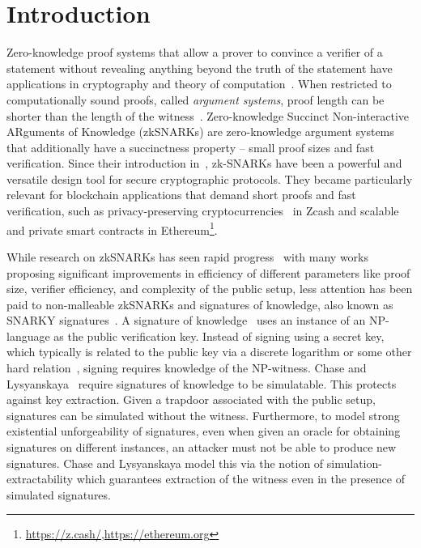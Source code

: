 \section{Introduction}
Zero-knowledge proof systems that allow a prover to convince a verifier of a statement without revealing anything beyond the truth of the statement have applications in cryptography and theory of computation~\cite{FOCS:GolMicWig86,STOC:Fortnow87,C:BGGHKMR88}. 
When restricted to computationally sound proofs, called \emph{argument systems}, proof length can be shorter than the length of the witness~\cite{brassard1988minimum}. 
Zero-knowledge Succinct Non-interactive ARguments of Knowledge (zkSNARKs) are zero-knowledge argument systems that additionally have a succinctness property -- small proof sizes and fast verification. 
Since their introduction in~\cite{FOCS:Micali94}, zk-SNARKs have been a powerful and versatile design tool for secure cryptographic protocols. They became particularly relevant for blockchain applications that demand short proofs and fast verification, such as privacy-preserving cryptocurrencies~\cite{SP:BCGGMT14} in Zcash and scalable and private smart contracts in Ethereum\footnote{\url{https://z.cash/},\url{https://ethereum.org}}.


While research on zkSNARKs has seen rapid progress~\cite{EC:GGPR13,IKO07,AC:Groth10a,TCC:Lipmaa12,TCC:BCIOP13,SP:PHGR13,C:BCGTV13,AC:Lipmaa13,USENIX:BCTV14,EC:Groth16} with many works proposing significant improvements in efficiency of different parameters like proof size, verifier efficiency, and complexity of the public setup, less attention has been paid to non-malleable zkSNARKs and signatures of knowledge, also known as SNARKY signatures~\cite{C:GroMal17,EPRINT:BKSV20}. A signature of knowledge~\cite{C:CamSta97,C:ChaLys06} uses an instance of an NP-language as the public verification key. Instead of signing using a secret key, which typically is related to the public key via a discrete logarithm or some other hard relation~\cite{AC:DHLW10}, signing requires knowledge of the NP-witness. Chase and Lysyanskaya~\cite{C:ChaLys06} require signatures of knowledge to be simulatable. This protects against key extraction. Given a trapdoor associated with the public setup, signatures can be simulated without the witness. Furthermore, to model strong existential unforgeability of signatures, even when given an oracle for obtaining signatures on different instances, an attacker must not be able to produce new signatures. Chase and Lysyanskaya model this via the notion of simulation-extractability which guarantees extraction of the witness even in the presence of simulated signatures.

